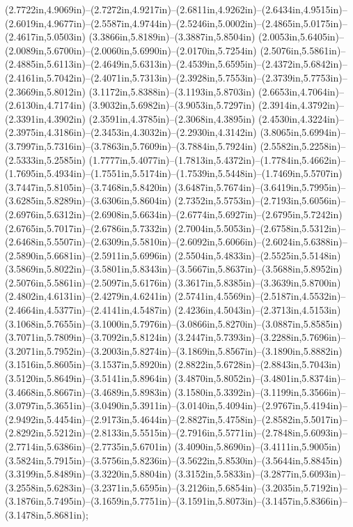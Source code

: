 (2.7722in,4.9069in)--(2.7272in,4.9217in)--(2.6811in,4.9262in)--(2.6434in,4.9515in)--(2.6019in,4.9677in)--(2.5587in,4.9744in)--(2.5246in,5.0002in)--(2.4865in,5.0175in)--(2.4617in,5.0503in) (3.3866in,5.8189in)--(3.3887in,5.8504in) (2.0053in,5.6405in)--(2.0089in,5.6700in)--(2.0060in,5.6990in)--(2.0170in,5.7254in) (2.5076in,5.5861in)--(2.4885in,5.6113in)--(2.4649in,5.6313in)--(2.4539in,5.6595in)--(2.4372in,5.6842in)--(2.4161in,5.7042in)--(2.4071in,5.7313in)--(2.3928in,5.7553in)--(2.3739in,5.7753in)--(2.3669in,5.8012in) (3.1172in,5.8388in)--(3.1193in,5.8703in) (2.6653in,4.7064in)--(2.6130in,4.7174in) (3.9032in,5.6982in)--(3.9053in,5.7297in) (2.3914in,4.3792in)--(2.3391in,4.3902in) (2.3591in,4.3785in)--(2.3068in,4.3895in) (2.4530in,4.3224in)--(2.3975in,4.3186in)--(2.3453in,4.3032in)--(2.2930in,4.3142in) (3.8065in,5.6994in)--(3.7997in,5.7316in)--(3.7863in,5.7609in)--(3.7884in,5.7924in) (2.5582in,5.2258in)--(2.5333in,5.2585in) (1.7777in,5.4077in)--(1.7813in,5.4372in)--(1.7784in,5.4662in)--(1.7695in,5.4934in)--(1.7551in,5.5174in)--(1.7539in,5.5448in)--(1.7469in,5.5707in) (3.7447in,5.8105in)--(3.7468in,5.8420in) (3.6487in,5.7674in)--(3.6419in,5.7995in)--(3.6285in,5.8289in)--(3.6306in,5.8604in) (2.7352in,5.5753in)--(2.7193in,5.6056in)--(2.6976in,5.6312in)--(2.6908in,5.6634in)--(2.6774in,5.6927in)--(2.6795in,5.7242in) (2.6765in,5.7017in)--(2.6786in,5.7332in) (2.7004in,5.5053in)--(2.6758in,5.5312in)--(2.6468in,5.5507in)--(2.6309in,5.5810in)--(2.6092in,5.6066in)--(2.6024in,5.6388in)--(2.5890in,5.6681in)--(2.5911in,5.6996in) (2.5504in,5.4833in)--(2.5525in,5.5148in) (3.5869in,5.8022in)--(3.5801in,5.8343in)--(3.5667in,5.8637in)--(3.5688in,5.8952in) (2.5076in,5.5861in)--(2.5097in,5.6176in) (3.3617in,5.8385in)--(3.3639in,5.8700in) (2.4802in,4.6131in)--(2.4279in,4.6241in) (2.5741in,4.5569in)--(2.5187in,4.5532in)--(2.4664in,4.5377in)--(2.4141in,4.5487in) (2.4236in,4.5043in)--(2.3713in,4.5153in) (3.1068in,5.7655in)--(3.1000in,5.7976in)--(3.0866in,5.8270in)--(3.0887in,5.8585in) (3.7071in,5.7809in)--(3.7092in,5.8124in) (3.2447in,5.7393in)--(3.2288in,5.7696in)--(3.2071in,5.7952in)--(3.2003in,5.8274in)--(3.1869in,5.8567in)--(3.1890in,5.8882in) (3.1516in,5.8605in)--(3.1537in,5.8920in) (2.8822in,5.6728in)--(2.8843in,5.7043in) (3.5120in,5.8649in)--(3.5141in,5.8964in) (3.4870in,5.8052in)--(3.4801in,5.8374in)--(3.4668in,5.8667in)--(3.4689in,5.8983in) (3.1580in,5.3392in)--(3.1199in,5.3566in)--(3.0797in,5.3651in)--(3.0490in,5.3911in)--(3.0140in,5.4094in)--(2.9767in,5.4194in)--(2.9492in,5.4454in)--(2.9173in,5.4644in)--(2.8827in,5.4758in)--(2.8582in,5.5017in)--(2.8292in,5.5212in)--(2.8133in,5.5515in)--(2.7916in,5.5771in)--(2.7848in,5.6093in)--(2.7714in,5.6386in)--(2.7735in,5.6701in) (3.4090in,5.8690in)--(3.4111in,5.9005in) (3.5824in,5.7915in)--(3.5756in,5.8236in)--(3.5622in,5.8530in)--(3.5644in,5.8845in) (3.3199in,5.8489in)--(3.3220in,5.8804in) (3.3152in,5.5833in)--(3.2877in,5.6093in)--(3.2558in,5.6283in)--(3.2371in,5.6595in)--(3.2126in,5.6854in)--(3.2035in,5.7192in)--(3.1876in,5.7495in)--(3.1659in,5.7751in)--(3.1591in,5.8073in)--(3.1457in,5.8366in)--(3.1478in,5.8681in);
